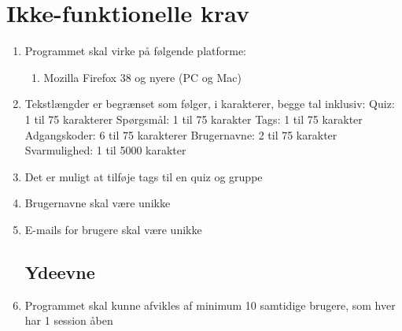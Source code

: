 \section{Ikke-funktionelle krav}
\label{sec:nonFunctional}

\begin{enumerate}
	\subsection*{Brugbarhed}
	\item Programmet skal virke på følgende platforme:
	\begin{enumerate}
		\item Mozilla Firefox 38 og nyere (PC og Mac)
	\end{enumerate}

	\item Tekstlængder er begrænset som følger, i karakterer, begge tal inklusiv:
	\subitem Quiz: 1 til 75 karakterer
	\subitem Spørgsmål: 1 til 75 karakter
	\subitem Tags: 1 til 75 karakter
	\subitem Adgangskoder: 6 til 75 karakterer
	\subitem Brugernavne: 2 til 75 karakter
	\subitem Svarmulighed: 1 til 5000 karakter
	\item Det er muligt at tilføje tags til en quiz og gruppe
	\item Brugernavne skal være unikke
	\item E-mails for brugere skal være unikke
	
	\subsection*{Ydeevne}
	\item Programmet skal kunne afvikles af minimum 10 samtidige brugere, som hver har 1 session åben
\end{enumerate}